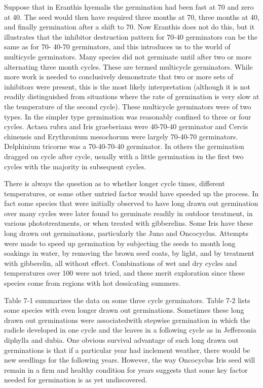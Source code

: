 Suppose that in Eranthis hyemalis the germination had been fast at 70 and zero
at 40. The seed would then have required three months at 70, three months at 40, and
finally germination after a shift to 70. Now Eranthis does not do this, but it illustrates
that the inhibitor destruction pattern for 70-40 germinators can be the same as for 70-
40-70 germinators, and this introduces us to the world of multicycle germinators.
Many species did not germinate until after two or more alternating three month
cycles. These are termed multicycle germinators. While more work is needed to
conclusively demonstrate that two or more sets of inhibitors were present, this is the
most likely interpretation (although it is not readily distinguished from situations where
the rate of germination is very slow at the temperature of the second cycle). These
multicycle germinators were of two types. In the simpler type germination was
reasonably confined to three or four cycles. Actaea rubra and Iris graeberiana were
40-70-40 germinator and Cercis chinensis and Erythronium mesochorum were largely
70-40-70 germinators. Delphinium tricorne was a 70-40-70-40 germinator. In others
the germination dragged on cycle after cycle, usually with a little germination in the first
two cycles with the majority in subsequent cycles.

There is always the question as to whether longer cycle times, different
temperatures, or some other untried factor would have speeded up the process. In fact
some species that were initially observed to have long drawn out germination over
many cycles were later found to germinate readily in outdoor treatment, in various
phototreatments, or when treated with gibberelins. Some Iris have these long drawn
out germinations, particularly the Juno and Oncocyclus. Attempts were made to speed
up germination by subjecting the seeds to month long soakings in water, by removing
the brown seed coats, by light, and by treatment with gibberelin, all without effect.
Combinations of wet and dry cycles and temperatures over 100 were not tried, and
these merit exploration since these species come from regions with hot dessicating
summers.

Table 7-1 summarizes the data on some three cycle germinators. Table 7-2 lists
some species with even longer drawn out germinations. Sometimes these long drawn
out germinations were associatedwith stepwise germination in which the radicle
developed in one cycle and the leaves in a following cycle as in Jeffersonia diphylla
and dubia. One obvious survival advantage of such long drawn out germinations is
that if a particular year had inclement weather, there would be new seedlings for the
following years. However, the way Oncocyclus Iris seed will remain in a firm and
healthy condition for years suggests that some key factor needed for germination is as
yet undiscovered.

